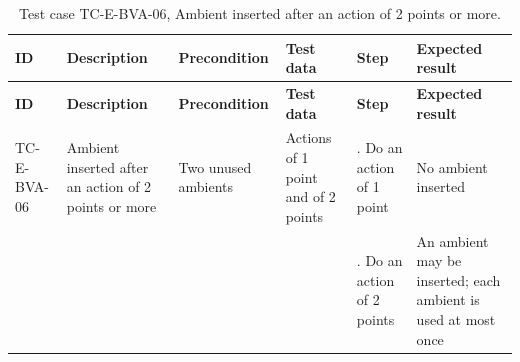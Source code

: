 {\footnotesize{}\renewcommand{\arraystretch}{1.1}
\begin{longtable}{|>{\raggedright\arraybackslash}p{}|>{\raggedright\arraybackslash}p{}|>{\raggedright\arraybackslash}p{}|>{\raggedright\arraybackslash}p{}|>{\raggedright\arraybackslash}p{}|>{\raggedright\arraybackslash}p{}|}
\caption{Test case TC-\allowbreak{}E-\allowbreak{}BVA-\allowbreak{}06, Ambient inserted after an action of 2 points or more.} \\
\hline
\textbf{ID} & \textbf{Description} & \textbf{Precondition} & \textbf{Test data} & \textbf{Step} & \textbf{Expected result} \\ \hline
\endfirsthead
\hline
\textbf{ID} & \textbf{Description} & \textbf{Precondition} & \textbf{Test data} & \textbf{Step} & \textbf{Expected result} \\ \hline
\endhead
TC-E-BVA-06 & Ambient inserted after an action of 2 points or more & Two unused ambients & Actions of 1 point and of 2 points & 1. Do an action of 1 point & No ambient inserted \\ \cline{5-6}
 &  &  &  & 2. Do an action of 2 points & An ambient may be inserted; each ambient is used at most once \\ \hline
\end{longtable}
}

